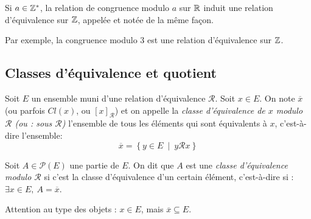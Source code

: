 \begin{definition}
Si $a\in \mathbb{Z}^*$, la relation de congruence modulo $a$ sur $\mathbb{R}$ induit une relation d'équivalence sur $\mathbb{Z}$, appelée et notée de la même façon.
\end{definition}

Par exemple, la congruence modulo $3$ est une relation d'équivalence sur $\mathbb{Z}$.

\subsection{Classes d'équivalence et quotient}
\begin{definition}
Soit $E$ un ensemble muni d'une relation d'équivalence ${\mathcal R}$. Soit $x\in E$. On note $\overline{x}$ (ou parfois $Cl(x)$, ou $[x]_{\mathcal R}$) et on appelle la \emph{classe d'équivalence de $x$ modulo $\mathcal R$ (ou : sous $\mathcal R$)} l'ensemble  de tous les éléments qui sont équivalents à $x$, c'est-à-dire l'ensemble:
\[
\overline x = \left\{y\in E\:\mid\: y{\mathcal R}x\right\}
\]


Soit $A\in \mathcal P(E)$ une partie de $E$. On dit que $A$ est une \emph{classe d'équivalence modulo $\mathcal R$} si c'est la classe d'équivalence d'un certain élément, c'est-à-dire si : $\exists x\in E, \: A=\overline x$.
\end{definition}

Attention au type des objets : $x \in E$, mais $\overline{x} \subseteq E$.

